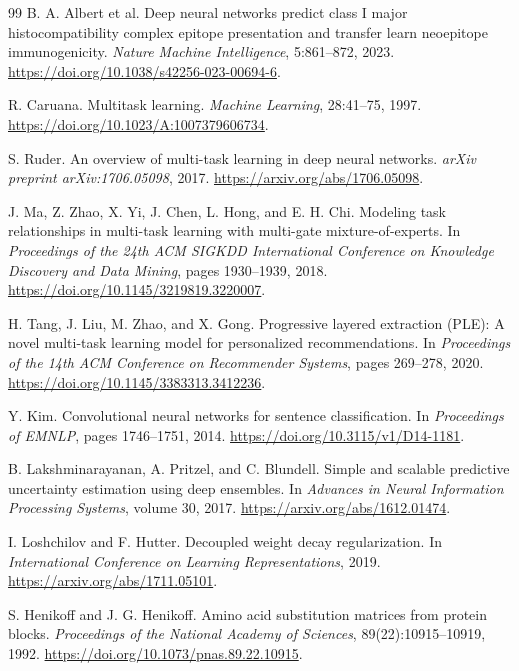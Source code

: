 \begin{thebibliography}{99}
B. A. Albert et al.
\newblock Deep neural networks predict class I major histocompatibility complex epitope presentation and transfer learn neoepitope immunogenicity.
\newblock \emph{Nature Machine Intelligence}, 5:861--872, 2023.
\newblock \url{https://doi.org/10.1038/s42256-023-00694-6}.

R. Caruana.
\newblock Multitask learning.
\newblock \emph{Machine Learning}, 28:41--75, 1997.
\newblock \url{https://doi.org/10.1023/A:1007379606734}.

S. Ruder.
\newblock An overview of multi-task learning in deep neural networks.
\newblock \emph{arXiv preprint arXiv:1706.05098}, 2017.
\newblock \url{https://arxiv.org/abs/1706.05098}.

J. Ma, Z. Zhao, X. Yi, J. Chen, L. Hong, and E. H. Chi.
\newblock Modeling task relationships in multi-task learning with multi-gate mixture-of-experts.
\newblock In \emph{Proceedings of the 24th ACM SIGKDD International Conference on Knowledge Discovery and Data Mining}, pages 1930--1939, 2018.
\newblock \url{https://doi.org/10.1145/3219819.3220007}.

H. Tang, J. Liu, M. Zhao, and X. Gong.
\newblock Progressive layered extraction (PLE): A novel multi-task learning model for personalized recommendations.
\newblock In \emph{Proceedings of the 14th ACM Conference on Recommender Systems}, pages 269--278, 2020.
\newblock \url{https://doi.org/10.1145/3383313.3412236}.

Y. Kim.
\newblock Convolutional neural networks for sentence classification.
\newblock In \emph{Proceedings of EMNLP}, pages 1746--1751, 2014.
\newblock \url{https://doi.org/10.3115/v1/D14-1181}.

B. Lakshminarayanan, A. Pritzel, and C. Blundell.
\newblock Simple and scalable predictive uncertainty estimation using deep ensembles.
\newblock In \emph{Advances in Neural Information Processing Systems}, volume 30, 2017.
\newblock \url{https://arxiv.org/abs/1612.01474}.

I. Loshchilov and F. Hutter.
\newblock Decoupled weight decay regularization.
\newblock In \emph{International Conference on Learning Representations}, 2019.
\newblock \url{https://arxiv.org/abs/1711.05101}.

S. Henikoff and J. G. Henikoff.
\newblock Amino acid substitution matrices from protein blocks.
\newblock \emph{Proceedings of the National Academy of Sciences}, 89(22):10915--10919, 1992.
\newblock \url{https://doi.org/10.1073/pnas.89.22.10915}.


\end{thebibliography}
